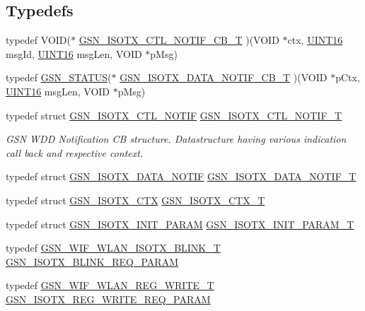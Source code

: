 \subsection*{Typedefs}
\begin{DoxyCompactItemize}
\item 
typedef VOID($\ast$ \hyperlink{a00520_a5fb480486e6585bd46bfcb3ad503bdd4}{GSN\_\-ISOTX\_\-CTL\_\-NOTIF\_\-CB\_\-T} )(VOID $\ast$ctx, \hyperlink{a00660_ga09f1a1fb2293e33483cc8d44aefb1eb1}{UINT16} msgId, \hyperlink{a00660_ga09f1a1fb2293e33483cc8d44aefb1eb1}{UINT16} msgLen, VOID $\ast$pMsg)
\item 
typedef \hyperlink{a00660_gada5951904ac6110b1fa95e51a9ddc217}{GSN\_\-STATUS}($\ast$ \hyperlink{a00520_ae9071f19d1fb2c67ee3777a8e1306727}{GSN\_\-ISOTX\_\-DATA\_\-NOTIF\_\-CB\_\-T} )(VOID $\ast$pCtx, \hyperlink{a00660_ga09f1a1fb2293e33483cc8d44aefb1eb1}{UINT16} msgLen, VOID $\ast$pMsg)
\item 
typedef struct \hyperlink{a00101}{GSN\_\-ISOTX\_\-CTL\_\-NOTIF} \hyperlink{a00677_ga26be8d25f388b7b118a0cd750dbdaeb1}{GSN\_\-ISOTX\_\-CTL\_\-NOTIF\_\-T}
\begin{DoxyCompactList}\small\item\em GSN WDD Notification CB structure. Datastructure having various indication call back and respective context. \end{DoxyCompactList}\item 
typedef struct \hyperlink{a00103}{GSN\_\-ISOTX\_\-DATA\_\-NOTIF} \hyperlink{a00520_a54682365586a2d8a710c34eb46a2cdef}{GSN\_\-ISOTX\_\-DATA\_\-NOTIF\_\-T}
\item 
typedef struct \hyperlink{a00102}{GSN\_\-ISOTX\_\-CTX} \hyperlink{a00520_a7a3f270b271183e40e25c7967da7798a}{GSN\_\-ISOTX\_\-CTX\_\-T}
\item 
typedef struct \hyperlink{a00104}{GSN\_\-ISOTX\_\-INIT\_\-PARAM} \hyperlink{a00520_af2ad415cfc6e0a9f2f0011a787436ead}{GSN\_\-ISOTX\_\-INIT\_\-PARAM\_\-T}
\item 
typedef \hyperlink{a00383}{GSN\_\-WIF\_\-WLAN\_\-ISOTX\_\-BLINK\_\-T} \hyperlink{a00520_a9ac94969b34cb75f0c095457d6efb945}{GSN\_\-ISOTX\_\-BLINK\_\-REQ\_\-PARAM}
\item 
typedef \hyperlink{a00394}{GSN\_\-WIF\_\-WLAN\_\-REG\_\-WRITE\_\-T} \hyperlink{a00520_acc2251c5b5d00db42ec7e821e9707f60}{GSN\_\-ISOTX\_\-REG\_\-WRITE\_\-REQ\_\-PARAM}
\end{DoxyCompactItemize}


